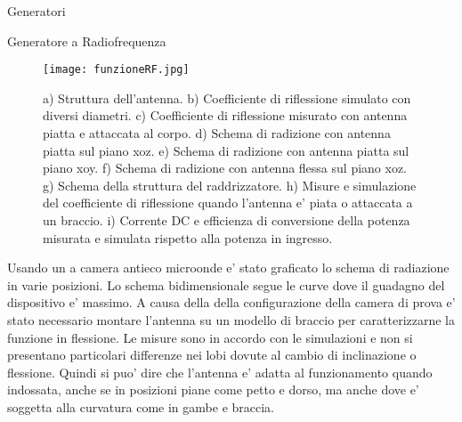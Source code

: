\begin{section}{Generatori}
\begin{subsection}{Generatore a Radiofrequenza}
        \begin{figure}[hbt!]
            \texttt{[image: funzioneRF.jpg]}
            \centering
            \caption{a) Struttura dell'antenna. b) Coefficiente di riflessione simulato con diversi diametri. c) Coefficiente di riflessione misurato con antenna piatta e attaccata al corpo. d) Schema di radizione con antenna piatta sul piano xoz. e) Schema di radizione con antenna piatta sul piano xoy. f) Schema di radizione con antenna flessa sul piano xoz. g) Schema della struttura del raddrizzatore. h) Misure e simulazione del coefficiente di riflessione quando l'antenna e' piata o attaccata a un braccio. i) Corrente DC e efficienza di conversione della potenza misurata e simulata rispetto alla potenza in ingresso.}
        \end{figure}
        
        Usando un a camera antieco microonde e' stato graficato lo schema di radiazione in varie posizioni. Lo schema bidimensionale segue le curve dove il guadagno del dispositivo e' massimo. A causa della della configurazione della camera di prova e' stato necessario montare l'antenna su un modello di braccio per caratterizzarne la funzione in flessione. Le misure sono in accordo con le simulazioni e non si presentano particolari differenze nei lobi dovute al cambio di inclinazione o flessione. Quindi si puo' dire che l'antenna e' adatta al funzionamento quando indossata, anche se in posizioni piane come petto e dorso, ma anche dove e' soggetta alla curvatura come in gambe e braccia.


\end{subsection}
\end{section}
